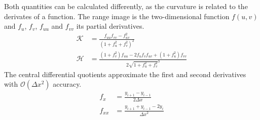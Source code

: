 Both quantities can be calculated differently, as the \gls{curvature} is related to the derivates of a function.
The range image is the two-dimensional function $f(u, v)$ and $f_u$, $f_v$, $f_{uu}$ and $f_{vv}$ its partial derivatives.
\begin{equation}
\begin{aligned}
    \mathcal{K} &= \frac{f_{uu} f_{vv} - f_{uv}^2}{{(1 + f_u^2 + f_v^2)}^2} \\
    \mathcal{H} &= \frac{{(1 + f_{v}^2)} f_{uu} - 2 f_u f_v f_{uv} + {(1 + f_u^2)} f_{vv}}{2 \sqrt{1 + f_u^2 + f_v^2}^3}
\end{aligned}
\end{equation}
The central differential quotients approximate the first and second derivatives with $\mathcal{O}(\Delta x^2)$ accuracy.
\begin{align*}
    f_{x} &= \frac{y_{i+1} - y_{i-1}}{2 \Delta x} \\
    f_{xx} &= \frac{y_{i+1} + y_{i-1} - 2 y_{i}}{{\Delta x}^2}
\end{align*}

